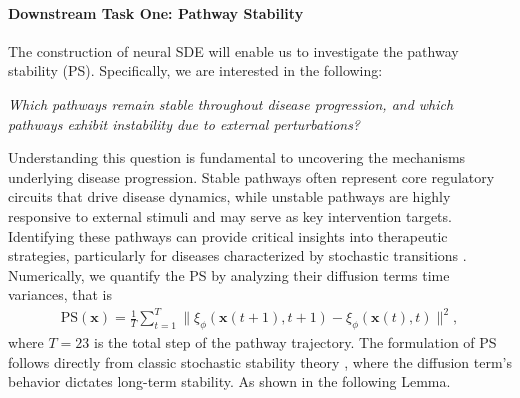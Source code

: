 \documentclass{article} %
\begin{document}
\paragraph{Downstream Task One: Pathway Stability}
The construction of neural SDE will enable us to investigate the pathway stability (PS). Specifically, we are interested in the following: 
\begin{tcolorbox}[colback=cyan!5, breakable]
{\begin{center}\textit{ Which pathways remain stable throughout disease progression, and which pathways exhibit instability due to external perturbations?}
\end{center}
}
\end{tcolorbox}
Understanding this question is fundamental to uncovering the mechanisms underlying disease progression. Stable pathways often represent core regulatory circuits that drive disease dynamics, while unstable pathways are highly responsive to external stimuli and may serve as key intervention targets. Identifying these pathways can provide critical insights into therapeutic strategies, particularly for diseases characterized by stochastic transitions \citep{gupta2011stochastic,panegyres2022stochasticity}. Numerically, we quantify the PS by analyzing their diffusion terms time variances, that is
\begin{align}\label{eq:ps}
    \mathrm{PS} (\mathbf x) = \frac1T \sum_{t=1}^T\|\xi_{\phi}(\mathbf{x}(t+1), t+1) - \xi_{\phi}(\mathbf{x}(t), t)\|^2,
\end{align}
where $T = 23$ is the total step of the pathway trajectory. The formulation of PS follows directly from classic stochastic stability theory \citep{khasminskii2012stochastic}, where the diffusion term's behavior dictates long-term stability. As shown in the following Lemma. 
\end{document}
